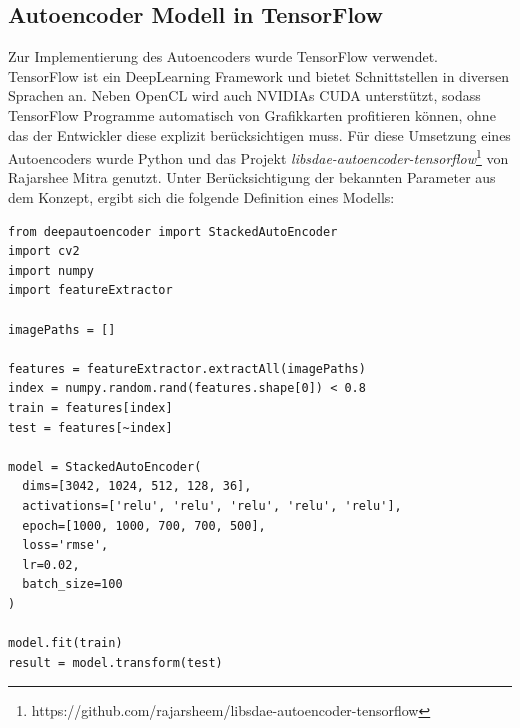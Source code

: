 \subsection{Autoencoder Modell in TensorFlow}

Zur Implementierung des Autoencoders wurde TensorFlow verwendet. TensorFlow ist ein DeepLearning Framework und bietet Schnittstellen in diversen Sprachen an. Neben OpenCL wird auch NVIDIAs CUDA unterstützt, sodass TensorFlow Programme automatisch von Grafikkarten profitieren können, ohne das der Entwickler diese explizit berücksichtigen muss. Für diese Umsetzung eines Autoencoders wurde Python und das Projekt \textit{libsdae-autoencoder-tensorflow}\footnote{https://github.com/rajarsheem/libsdae-autoencoder-tensorflow} von Rajarshee Mitra genutzt. Unter Berücksichtigung der bekannten Parameter aus dem Konzept, ergibt sich die folgende Definition eines Modells:

\lstset{language=Python}
\begin{lstlisting}
from deepautoencoder import StackedAutoEncoder
import cv2
import numpy
import featureExtractor

imagePaths = []

features = featureExtractor.extractAll(imagePaths)
index = numpy.random.rand(features.shape[0]) < 0.8
train = features[index]
test = features[~index]

model = StackedAutoEncoder(
  dims=[3042, 1024, 512, 128, 36],
  activations=['relu', 'relu', 'relu', 'relu', 'relu'], 
  epoch=[1000, 1000, 700, 700, 500], 
  loss='rmse', 
  lr=0.02, 
  batch_size=100
)

model.fit(train)
result = model.transform(test)
\end{lstlisting}


